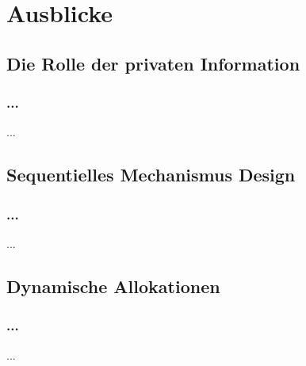 \section{Ausblicke}

\subsection{Die Rolle der privaten Information}
\begin{frame}
\frametitle{...}
\justifying
...

\end{frame}

\subsection{Sequentielles Mechanismus Design}
\begin{frame}
\frametitle{...}
\justifying
...

\end{frame}

\subsection{Dynamische Allokationen}
\begin{frame}
\frametitle{...}
\justifying
...

\end{frame}
